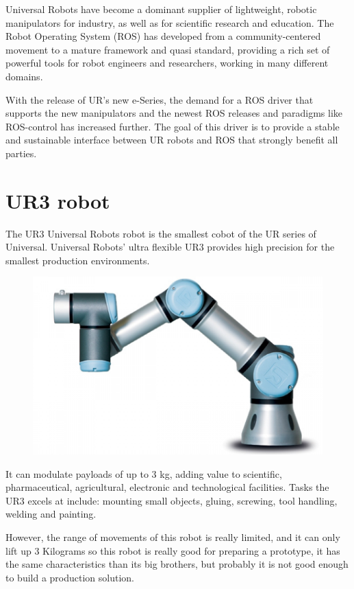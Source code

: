 	
		Universal Robots have become a dominant supplier of lightweight, robotic manipulators for industry, as well as for scientific research and education. The Robot Operating System (ROS) has developed from a community-centered movement to a mature framework and quasi standard, providing a rich set of powerful tools for robot engineers and researchers, working in many different domains.
		
		With the release of UR’s new e-Series, the demand for a ROS driver that supports the new manipulators and the newest ROS releases and paradigms like ROS-control has increased further. The goal of this driver is to provide a stable and sustainable interface between UR robots and ROS that strongly benefit all parties.
	
	
	\section{UR3 robot}
	
	
		The UR3 Universal Robots robot is the smallest cobot of the UR series of Universal. Universal Robots' ultra flexible UR3 provides high precision for the smallest production environments.
		
		\begin{figure}[h!]
			\centering
			\includegraphics[width=0.7\linewidth]{Images/logos/ur3}
			\label{fig:ur3}
		\end{figure}
	
		
		It can modulate payloads of up to 3 kg, adding value to scientific, pharmaceutical, agricultural, electronic and technological facilities. Tasks the UR3 excels at include: mounting small objects, gluing, screwing, tool handling, welding and painting.
		
		However, the range of movements of this robot is really limited, and it can only lift up 3 Kilograms so this robot is really good for preparing a prototype, it has the same characteristics than its big brothers, but probably it is not good enough to build a production solution.	
		
